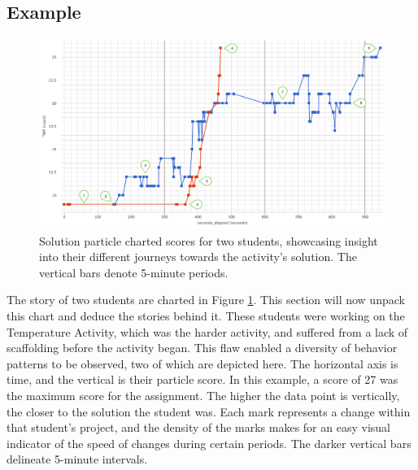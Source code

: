 \subsection{Example}

\begin{figure}
  \centering
      \includegraphics[width=\textwidth]{images/particles-graph-annotated}
  \caption[Solution particle charted scores for two students]{Solution particle charted scores for two students, showcasing insight into their different journeys towards the activity's solution. The vertical bars denote 5-minute periods.}
  \label{fig:paricles-temperature-two}
\end{figure}

The story of two students are charted in Figure \ref{fig:paricles-temperature-two}. This section will now unpack this chart and deduce the stories behind it. These students were working on the Temperature Activity, which was the harder activity, and suffered from a lack of scaffolding before the activity began. This flaw enabled a diversity of behavior patterns to be observed, two of which are depicted here. The horizontal axis is time, and the vertical is their particle score. In this example, a score of 27 was the maximum score for the assignment. The higher the data point is vertically, the closer to the solution the student was. Each mark represents a change within that student's project, and the density of the marks makes for an easy visual indicator of the speed of changes during certain periods. The darker vertical bars delineate 5-minute intervals.

